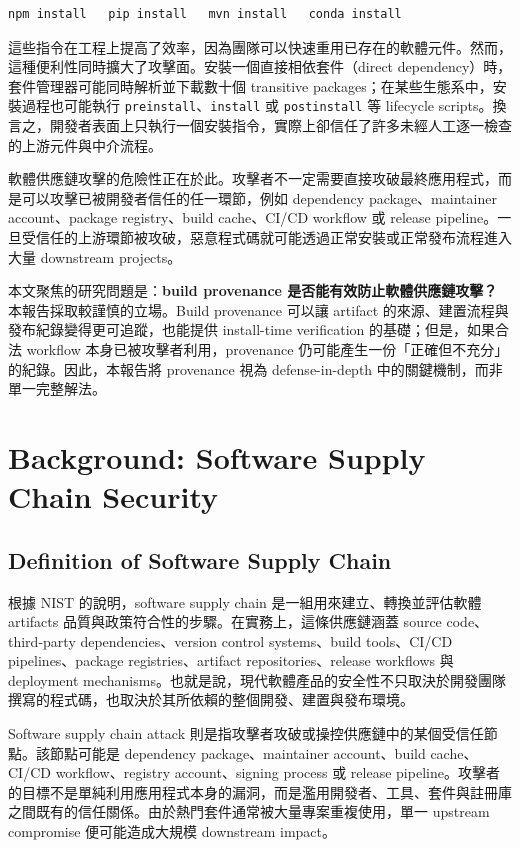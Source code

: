 \documentclass[12pt,a4paper]{article}
\begin{document}
\begin{lstlisting}[style=commandstyle]
npm install   pip install   mvn install   conda install
\end{lstlisting}

這些指令在工程上提高了效率，因為團隊可以快速重用已存在的軟體元件。然而，這種便利性同時擴大了攻擊面。安裝一個直接相依套件（direct dependency）時，套件管理器可能同時解析並下載數十個 transitive packages；在某些生態系中，安裝過程也可能執行 \texttt{preinstall}、\texttt{install} 或 \texttt{postinstall} 等 lifecycle scripts。換言之，開發者表面上只執行一個安裝指令，實際上卻信任了許多未經人工逐一檢查的上游元件與中介流程。

軟體供應鏈攻擊的危險性正在於此。攻擊者不一定需要直接攻破最終應用程式，而是可以攻擊已被開發者信任的任一環節，例如 dependency package、maintainer account、package registry、build cache、CI/CD workflow 或 release pipeline。一旦受信任的上游環節被攻破，惡意程式碼就可能透過正常安裝或正常發布流程進入大量 downstream projects。

本文聚焦的研究問題是：\textbf{build provenance 是否能有效防止軟體供應鏈攻擊？} 本報告採取較謹慎的立場。Build provenance 可以讓 artifact 的來源、建置流程與發布紀錄變得更可追蹤，也能提供 install-time verification 的基礎；但是，如果合法 workflow 本身已被攻擊者利用，provenance 仍可能產生一份「正確但不充分」的紀錄。因此，本報告將 provenance 視為 defense-in-depth 中的關鍵機制，而非單一完整解法。

\section{Background: Software Supply Chain Security}

\subsection{Definition of Software Supply Chain}

根據 NIST 的說明，software supply chain 是一組用來建立、轉換並評估軟體 artifacts 品質與政策符合性的步驟。在實務上，這條供應鏈涵蓋 source code、third-party dependencies、version control systems、build tools、CI/CD pipelines、package registries、artifact repositories、release workflows 與 deployment mechanisms。也就是說，現代軟體產品的安全性不只取決於開發團隊撰寫的程式碼，也取決於其所依賴的整個開發、建置與發布環境。

Software supply chain attack 則是指攻擊者攻破或操控供應鏈中的某個受信任節點。該節點可能是 dependency package、maintainer account、build cache、CI/CD workflow、registry account、signing process 或 release pipeline。攻擊者的目標不是單純利用應用程式本身的漏洞，而是濫用開發者、工具、套件與註冊庫之間既有的信任關係。由於熱門套件通常被大量專案重複使用，單一 upstream compromise 便可能造成大規模 downstream impact。
\end{document}
